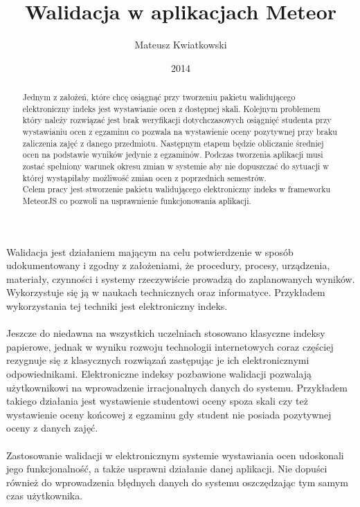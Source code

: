 \documentclass[brudnopis]{xmgr}
\author   {Mateusz Kwiatkowski}
\title    {Walidacja w aplikacjach Meteor}
\date     {2014}
\begin{document}
\begin{abstract}
Jednym z założeń, które chcę osiągnąć  przy tworzeniu pakietu walidującego elektroniczny indeks jest
wystawianie ocen z dostępnej skali.  Kolejnym problemem który należy rozwiązać jest brak weryfikacji
dotychczasowych osiągnięć studenta przy wystawianiu ocen z egzaminu co pozwala na wystawienie oceny
pozytywnej przy braku zaliczenia zajęć z danego przedmiotu. Następnym etapem będzie obliczanie średniej
ocen na podstawie wyników jedynie z egzaminów. Podczas tworzenia aplikacji musi zostać spełniony
warunek okresu zmian w systemie aby nie dopuszczać do sytuacji w której wystąpiłaby możliwość zmian
ocen z poprzednich semestrów.
\\
Celem pracy jest stworzenie pakietu walidującego elektroniczny indeks w frameworku MeteorJS co pozwoli
na usprawnienie funkcjonowania aplikacji.
 
\end{abstract}

\maketitle
%
\introduction

Walidacja jest działaniem mającym na celu potwierdzenie w sposób udokumentowany i zgodny
z założeniami, że procedury, procesy, urządzenia, materiały, czynności i systemy rzeczywiście
prowadzą do zaplanowanych wyników. Wykorzystuje się ją w naukach technicznych oraz informatyce.
Przykładem wykorzystania tej techniki jest elektroniczny indeks.
\\
\\
Jeszcze do niedawna na wszystkich uczelniach stosowano klasyczne indeksy papierowe,
jednak w wyniku rozwoju technologii internetowych coraz częściej rezygnuje się z klasycznych
rozwiązań zastępując je ich elektronicznymi odpowiednikami. Elektroniczne indeksy pozbawione
walidacji pozwalają użytkownikowi na wprowadzenie irracjonalnych danych do systemu.
Przykładem takiego działania jest wystawienie studentowi oceny spoza skali czy też wystawienie
oceny końcowej z egzaminu gdy student nie posiada pozytywnej oceny z danych zajęć.
\\
\\
Zastosowanie walidacji w elektronicznym systemie wystawiania ocen udoskonali jego funkcjonalność,
a także usprawni działanie danej aplikacji. Nie dopuści również do wprowadzenia błędnych danych do systemu
oszczędzając tym samym czas użytkownika.
\end{document}
